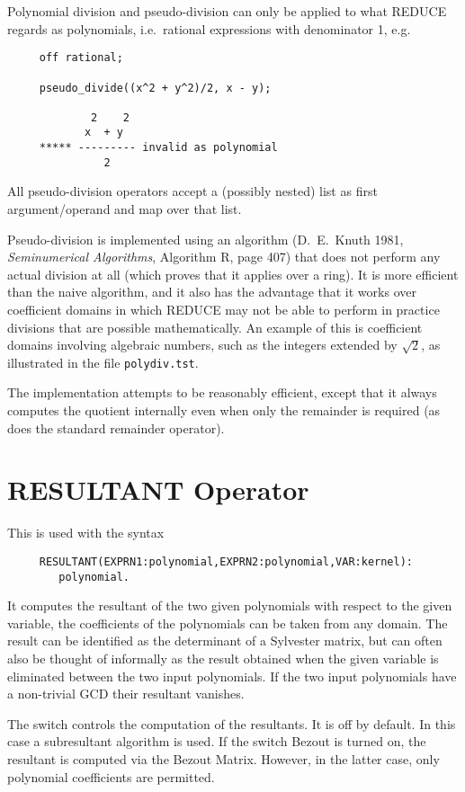 Polynomial division and pseudo-division can only be applied to what
REDUCE regards as polynomials, i.e.\ rational expressions with
denominator 1, e.g.
\begin{verbatim}
     off rational;

     pseudo_divide((x^2 + y^2)/2, x - y);

             2    2
            x  + y
     ***** --------- invalid as polynomial
               2
\end{verbatim}
All pseudo-division operators accept a (possibly nested) list as first
argument/operand and map over that list.

Pseudo-division is implemented using an algorithm (D.~E.~Knuth 1981,
\textit{Seminumerical Algorithms}, Algorithm R, page 407) that does
not perform any actual division at all (which proves that it applies
over a ring).  It is more efficient than the naive algorithm, and it
also has the advantage that it works over coefficient domains in which
REDUCE may not be able to perform in practice divisions that are
possible mathematically.  An example of this is coefficient domains
involving algebraic numbers, such as the integers extended by
$\sqrt{2}$, as illustrated in the file \texttt{polydiv.tst}.

The implementation attempts to be reasonably efficient, except that it
always computes the quotient internally even when only the remainder
is required (as does the standard remainder operator).

\section{RESULTANT Operator}
\hypertarget{operator:RESULTANT}{}
\hypertarget{switch:BEZOUT}{}

This is used with the syntax
\begin{verbatim}
     RESULTANT(EXPRN1:polynomial,EXPRN2:polynomial,VAR:kernel):
        polynomial.
\end{verbatim}
It computes the resultant of the two given polynomials with respect to the
given variable, the coefficients of the polynomials can be taken from any
domain. The result can be identified as the determinant of a
Sylvester matrix, but can often also be thought of informally as the
result obtained when the given variable is eliminated between the two input
polynomials. If the two input polynomials have a non-trivial GCD their
resultant vanishes.

The switch  controls the computation of the
resultants. It is off by default. In this case a subresultant algorithm
is used. If the switch Bezout is turned on, the resultant is computed via
the Bezout Matrix. However, in the latter case, only polynomial coefficients
are permitted.

